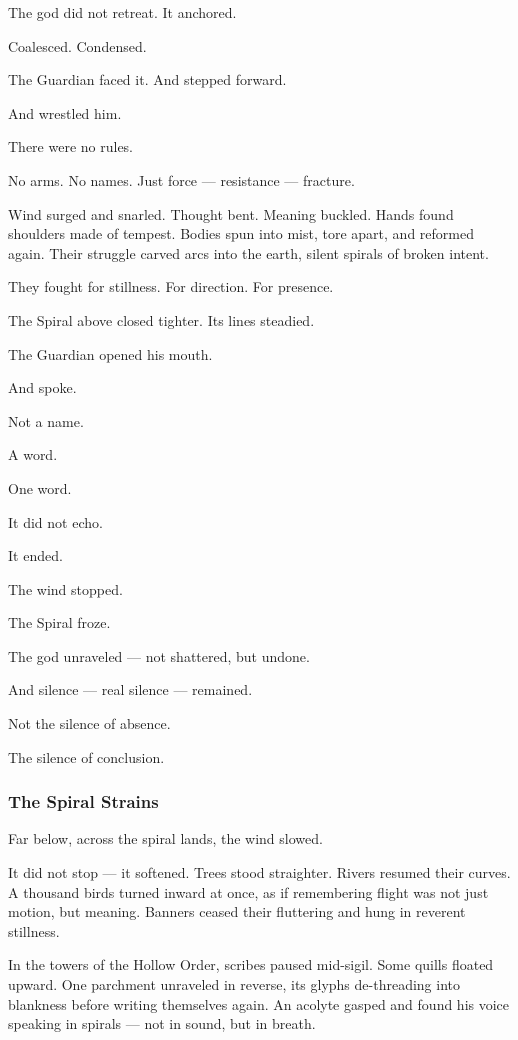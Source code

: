 \documentclass[12pt]{article}
\begin{document}
The god did not retreat. It anchored.

Coalesced. Condensed.

The Guardian faced it. And stepped forward.

And wrestled him.

There were no rules.

No arms. No names. Just force — resistance — fracture.

Wind surged and snarled. Thought bent. Meaning buckled. Hands found shoulders made of tempest. Bodies spun into mist, tore apart, and reformed again. Their struggle carved arcs into the earth, silent spirals of broken intent.

They fought for stillness. For direction. For presence.

The Spiral above closed tighter. Its lines steadied.

The Guardian opened his mouth.

And spoke.

Not a name.

A word.

One word.

It did not echo.

It ended.

The wind stopped.

The Spiral froze.

The god unraveled — not shattered, but undone.

And silence — real silence — remained.

Not the silence of absence.

The silence of conclusion.

\dotfill

\subsubsection*{The Spiral Strains}

Far below, across the spiral lands, the wind slowed.

It did not stop — it softened. Trees stood straighter. Rivers resumed their curves. A thousand birds turned inward at once, as if remembering flight was not just motion, but meaning. Banners ceased their fluttering and hung in reverent stillness.

In the towers of the Hollow Order, scribes paused mid-sigil. Some quills floated upward. One parchment unraveled in reverse, its glyphs de-threading into blankness before writing themselves again. An acolyte gasped and found his voice speaking in spirals — not in sound, but in breath.
\end{document}
